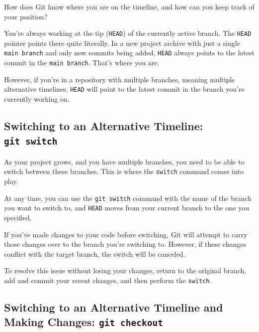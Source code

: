 \documentclass[
  letterpaper,
  DIV=11,
  numbers=noendperiod]{scrreprt}
\begin{document}
How does Git know where you are on the timeline, and how can you keep
track of your position?

You're always working at the tip (\texttt{HEAD}) of the currently active
branch. The \texttt{HEAD} pointer points there quite literally. In a new
project archive with just a single \texttt{main\ branch} and only new
commits being added, \texttt{HEAD} always points to the latest commit in
the \texttt{main\ branch}. That's where you are.

However, if you're in a repository with multiple branches, meaning
multiple alternative timelines, \texttt{HEAD} will point to the latest
commit in the branch you're currently working on.

\hypertarget{switching-to-an-alternative-timeline-git-switch}{%
\subsection{\texorpdfstring{Switching to an Alternative Timeline:
\texttt{git\ switch}}{Switching to an Alternative Timeline: git switch}}\label{switching-to-an-alternative-timeline-git-switch}}

As your project grows, and you have multiple branches, you need to be
able to switch between these branches. This is where the \texttt{switch}
command comes into play.

At any time, you can use the \texttt{git\ switch} command with the name
of the branch you want to switch to, and \texttt{HEAD} moves from your
current branch to the one you specified.

If you've made changes to your code before switching, Git will attempt
to carry those changes over to the branch you're switching to. However,
if these changes conflict with the target branch, the switch will be
canceled.

To resolve this issue without losing your changes, return to the
original branch, add and commit your recent changes, and then perform
the \texttt{switch}.

\hypertarget{switching-to-an-alternative-timeline-and-making-changes-git-checkout}{%
\subsection{\texorpdfstring{Switching to an Alternative Timeline and
Making Changes:
\texttt{git\ checkout}}{Switching to an Alternative Timeline and Making Changes: git checkout}}\label{switching-to-an-alternative-timeline-and-making-changes-git-checkout}}
\end{document}
